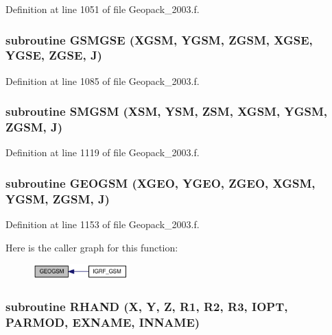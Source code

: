 Definition at line 1051 of file Geopack\_\-2003.f.\hypertarget{_geopack__2003_8f_44cb43398834cd0273a73264ea6e7057}{
\subsubsection[{GSMGSE}]{\setlength{\rightskip}{0pt plus 5cm}subroutine GSMGSE (XGSM, \/  YGSM, \/  ZGSM, \/  XGSE, \/  YGSE, \/  ZGSE, \/  J)}}
\label{_geopack__2003_8f_44cb43398834cd0273a73264ea6e7057}




Definition at line 1085 of file Geopack\_\-2003.f.\hypertarget{_geopack__2003_8f_3c1b6bd041138ad15b19a284572c0283}{
\subsubsection[{SMGSM}]{\setlength{\rightskip}{0pt plus 5cm}subroutine SMGSM (XSM, \/  YSM, \/  ZSM, \/  XGSM, \/  YGSM, \/  ZGSM, \/  J)}}
\label{_geopack__2003_8f_3c1b6bd041138ad15b19a284572c0283}




Definition at line 1119 of file Geopack\_\-2003.f.\hypertarget{_geopack__2003_8f_a724192dda005c0ef8d4e8cb9d5465dd}{
\subsubsection[{GEOGSM}]{\setlength{\rightskip}{0pt plus 5cm}subroutine GEOGSM (XGEO, \/  YGEO, \/  ZGEO, \/  XGSM, \/  YGSM, \/  ZGSM, \/  J)}}
\label{_geopack__2003_8f_a724192dda005c0ef8d4e8cb9d5465dd}




Definition at line 1153 of file Geopack\_\-2003.f.

Here is the caller graph for this function:\nopagebreak
\begin{figure}[H]
\begin{center}
\leavevmode
\includegraphics[width=104pt]{_geopack__2003_8f_a724192dda005c0ef8d4e8cb9d5465dd_icgraph}
\end{center}
\end{figure}
\hypertarget{_geopack__2003_8f_964ce3d6c1eb16a70ec41d33544e4d07}{
\subsubsection[{RHAND}]{\setlength{\rightskip}{0pt plus 5cm}subroutine RHAND (X, \/  Y, \/  Z, \/  R1, \/  R2, \/  R3, \/  IOPT, \/  PARMOD, \/  EXNAME, \/  INNAME)}}
\label{_geopack__2003_8f_964ce3d6c1eb16a70ec41d33544e4d07}




